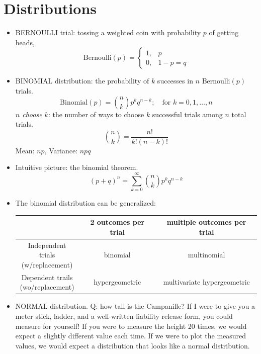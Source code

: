 \documentclass[12pt]{article}
\numberwithin{equation}{section}
\begin{document}
\section{Distributions}
\begin{itemize}
	\item BERNOULLI trial: tossing a weighted coin with probability $ p $ of getting heads,
	\begin{equation}
			\text{Bernoulli}(p)=\begin{cases}
				1,&p\\
				0,&1-p=q
			\end{cases}
	\end{equation}
	\item BINOMIAL distribution: the probability of $ k $ successes in $ n $ Bernoulli$ (p) $ trials.
	\begin{equation}
			\text{Binomial}(p) = {n \choose k} p^k q^{n-k};\quad\text{for }k=0, 1, \dots, n
	\end{equation}
	\textit{$ n $ choose $ k $}: the number of ways to choose $ k $ successful trials among $ n $  total trials.
	\begin{equation}
			{n\choose k} = \frac{n!}{k!(n-k)!}
	\end{equation}
	Mean: $ np $, Variance: $ npq $
	\item Intuitive picture: the binomial theorem.
	\begin{equation}
			(p+q)^n = \sum_{k=0}^\infty {n \choose k} p^k q^{n-k}
	\end{equation}

\item The binomial distribution can be generalized:

\begin{center}

\begin{tabular}{c|c|c}
	& \textbf{2 outcomes per trial} &\textbf{ multiple outcomes per trial}\\
	\midrule
	\shortstack{Independent trials\\(w/replacement)} & binomial & multinomial\\
	\midrule
	\shortstack{Dependent trails\\(wo/replacement)} & hypergeometric & multivariate hypergeometric
\end{tabular}
\end{center}

\item NORMAL distribution. Q: how tall is the Campanille? If I were to give you a meter stick, ladder, and a well-written liability release form, you could measure for yourself! If you were to measure the height 20 times, we would expect a slightly different value each time. If we were to plot the measured values, we would expect a distribution that looks like a normal distribution.


\end{itemize}
\end{document}
